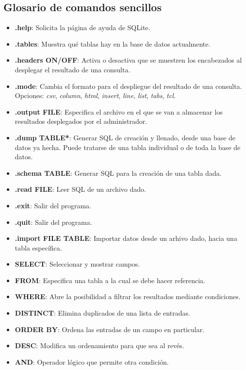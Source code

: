 \documentclass[10pt,letterpaper]{article}
\begin{document}
\subsection{Glosario de comandos sencillos}
\begin{small}

\begin{itemize}
\item \textbf{.help}: Solicita la p\'agina de ayuda de SQLite.
\item \textbf{.tables}: Muestra qu\'e tablas hay en la base de datos actualmente.
\item \textbf{.headers ON/OFF}: Activa o desactiva que se muestren los encabezados al desplegar el resultado de una consulta.
\item \textbf{.mode}: Cambia el formato para el despliegue del resultado de una consulta. Opciones: \textit{csv}, \textit{column}, \textit{html}, \textit{insert}, \textit{line}, \textit{list}, \textit{tabs}, \textit{tcl}.
\item \textbf{.output FILE}: Especifica el archivo en el que se van a almacenar los resultados desplegados por el administrador.
\item \textbf{.dump TABLE*}: Generar SQL de creaci\'on y llenado, desde una base de datos ya hecha. Puede tratarse de una tabla individual o de toda la base de datos.
\item \textbf{.schema TABLE}: Generar SQL para la creaci\'on de una tabla dada.
\item \textbf{.read FILE}: Leer SQL de un archivo dado.
\item \textbf{.exit}: Salir del programa.
\item \textbf{.quit}: Salir del programa.
\item \textbf{.import FILE TABLE}: Importar datos desde un arhivo dado, hacia una tabla espec\'ifica.
\item \textbf{SELECT}: Seleccionar y mostrar campos.
\item \textbf{FROM}: Especifica una tabla a la cual se debe hacer referencia.
\item \textbf{WHERE}: Abre la posibilidad a filtrar los resultados mediante condiciones.
\item \textbf{DISTINCT}: Elimina duplicados de una lista de entradas.
\item \textbf{ORDER BY}: Ordena las entradas de un campo en particular.
\item \textbf{DESC}: Modifica un ordenamiento para que sea al rev\'es.
\item \textbf{AND}: Operador l\'ogico que permite otra condici\'on.

\end{itemize}
\end{small}
\end{document}
